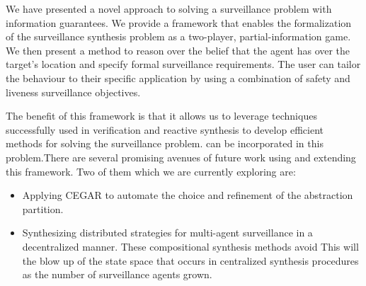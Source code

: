 We have presented a novel approach to solving a surveillance problem with information guarantees. We provide a framework that enables the  formalization of the surveillance synthesis problem as a two-player, partial-information game. We then present a method to reason over the belief that the agent has over the target's location and specify formal surveillance requirements. The user can tailor the behaviour to their specific application by using a combination of safety and liveness surveillance objectives.

The benefit of this framework is that it allows us to leverage techniques successfully used in verification and reactive synthesis to develop efficient methods for solving the surveillance problem. can be incorporated in this problem.There are several promising  avenues of future work using and extending this framework. Two of them which we are currently exploring are: 
\begin{itemize}
\item Applying  CEGAR to automate the choice and refinement of the abstraction partition.
\item Synthesizing distributed strategies for multi-agent surveillance in a decentralized manner. These compositional synthesis methods avoid This will the blow up of the state space that occurs in centralized synthesis procedures as the number of surveillance agents grown.
\end{itemize}